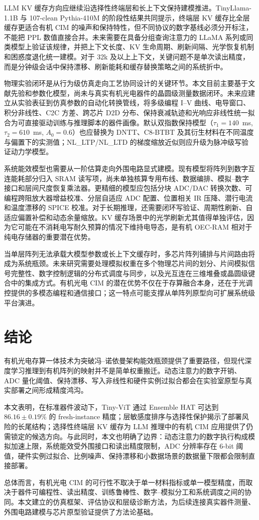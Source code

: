 LLM KV 缓存方向应继续沿选择性终端层和长上下文保持建模推进。TinyLlama-1.1B 与 107-clean Pythia-410M 的阶段性结果共同提示，终端层 KV 缓存比全层缓存更适合有机 CIM 的噪声和保持特性，但不同协议的数字基线必须分开标注，不能把 PPL 数值直接合并。未来需要在具备分组查询注意力的 LLaMA 系列或同类模型上验证该规律，并把上下文长度、KV 生命周期、刷新间隔、光学恢复机制和困惑度退化统一建模。对于 32k 及以上上下文，关键问题不是单次读出精度，而是分钟级会话中保持漂移、刷新能耗和缓存替换策略之间的系统折中。

物理实验闭环是从行为级仿真走向工艺协同设计的关键环节。本文目前主要基于文献先验和参数化模型，尚未与真实有机光电器件的晶圆级测量数据闭环。未来应建立从实验表征到仿真参数的自动化转换管线，将多级编程 I--V 曲线、电导窗口、积分非线性、C2C 方差、跨芯片 D2D 分布、保持衰减轨迹和光响应非线性统一拟合为可直接驱动训练与推理脚本的器件画像。默认双指数保持模型（$\tau_1=140$~ms, $\tau_2=610$~ms, $A_0=0.6$）也应替换为 DNTT、C8-BTBT 及其衍生材料在不同温度与偏置下的实测值；NL\_LTP/NL\_LTD 的梯度缩放近似则应升级为脉冲级写验证动力学模型。

系统能效模型也需要从一阶估算走向外围电路显式建模。现有模型将阵列到数字互连能耗部分归入 SRAM 读写项，尚未单独核算专用布线、数据编排、模拟--数字接口和层间尺度恢复乘法器。更精细的模型应包括分块 ADC/DAC 转换次数、可编程跨阻放大器增益校准、分层自适应 ADC 配置、位置相关 IR 压降、潜行电流和温度漂移的 SPICE 校准。对于长期推理，还需要闭环写验证、周期性刷新、自适应偏置补偿和动态余量缩放。KV 缓存场景中的光学刷新尤其值得单独评估，因为它可能在不消耗电写耐久预算的情况下维持电导态，是有机 OEC-RAM 相对于纯电存储器的重要潜在优势。

当单层阵列无法承载大模型参数或长上下文缓存时，多芯片阵列铺排与片间路由将成为系统瓶颈。未来研究需要处理模拟权重在多个物理芯片间的划分、片间模拟信号完整性、数字控制逻辑的分布式调度与同步，以及光互连在三维堆叠或晶圆级键合中的集成方式。有机光电 CIM 的潜在优势不仅在于存算融合本身，还在于光调控提供的多模态编程和通信接口；这一特点可能支撑从单阵列原型向可扩展系统级平台演进。

\FloatBarrier

\section{结论}

有机光电存算一体技术为突破冯--诺依曼架构能效瓶颈提供了重要路径，但现代深度学习推理到有机阵列的映射并不是简单权重搬迁。动态注意力的数字开销、ADC 量化阈值、保持漂移、写入非线性和硬件实例过拟合都会在实验室原型与真实部署之间形成精度鸿沟。

本文表明，在标准器件波动下，Tiny-ViT 通过 Ensemble HAT 可达到 $86.16\pm0.19\%$ 的 fresh-instance 精度；层敏感度排序与选择性保护揭示了部署风险的长尾结构；选择性终端层 KV 缓存为 LLM 推理中的有机 CIM 应用提供了仍需锁定的候选方向。与此同时，本文也明确了边界：动态注意力的数字执行构成模拟加速上限，系统能效受外围接口和读出精度限制，ADC 分辨率存在 6-bit 阈值，硬件实例过拟合、比例噪声、保持漂移和小数据场景的数据量下限都会限制直接部署。

总体而言，有机光电 CIM 的可行性不取决于单一材料指标或单一模型精度，而取决于器件可编程性、读出精度、训练鲁棒性、数字--模拟分工和系统调度之间的协同。本文建立的仿真框架、评估协议和层级诊断方法，为后续连接真实器件测量、外围电路建模与芯片原型验证提供了方法论基础。
